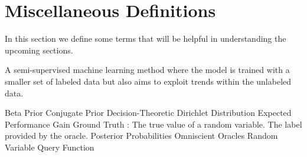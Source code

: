 
\section{Miscellaneous Definitions}

In this section we define some terms that will be helpful in understanding the upcoming sections.

\begin{defn}
\label{def:active-learning}
A semi-supervised machine learning method where the model is trained with a smaller set of labeled data but also aims to exploit trends within the unlabeled data.
\end{defn}

Beta Prior
Conjugate Prior
Decision-Theoretic
Dirichlet Distribution
Expected Performance Gain
Ground Truth : The true value of a random variable. The label provided by the oracle.
Posterior Probabilities
Omniscient Oracles
Random Variable
Query Function


